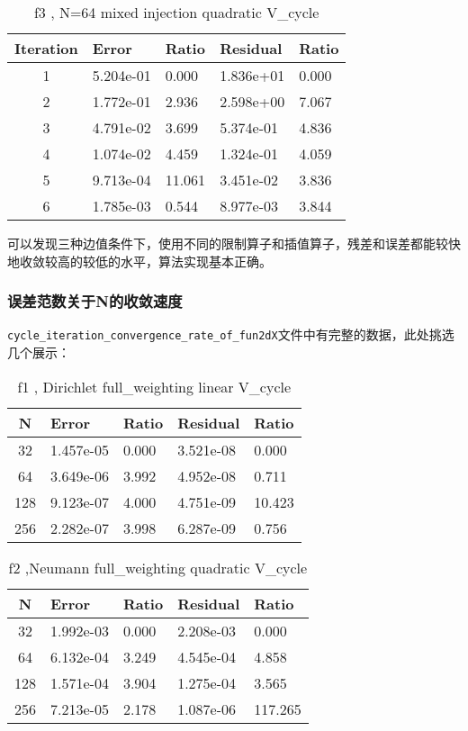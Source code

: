 \documentclass[12]{article}%
\begin{document}
\begin{table}[H]
    \centering
    \caption{f3 , N=64  mixed injection quadratic V\_cycle}
    \begin{tabular}{|c|l|l|l|l|}
    \hline
    Iteration & Error       & Ratio     & Residual    & Ratio     \\ \hline
 1 & 5.204e-01 & 0.000 & 1.836e+01 & 0.000\\ \hline 
 2 & 1.772e-01 & 2.936 & 2.598e+00 & 7.067\\ \hline 
 3 & 4.791e-02 & 3.699 & 5.374e-01 & 4.836\\ \hline 
 4 & 1.074e-02 & 4.459 & 1.324e-01 & 4.059\\ \hline 
 5 & 9.713e-04 & 11.061 & 3.451e-02 & 3.836\\ \hline 
 6 & 1.785e-03 & 0.544 & 8.977e-03 & 3.844\\ \hline    \end{tabular}
    \end{table}
    
可以发现三种边值条件下，使用不同的限制算子和插值算子，残差和误差都能较快地收敛较高的较低的水平，算法实现基本正确。

\subsubsection{{误差范数关于N的收敛速度}}

\verb|cycle_iteration_convergence_rate_of_fun2dX|文件中有完整的数据，此处挑选几个展示：

\begin{table}[H]
    \centering
    \caption{f1 , Dirichlet full\_weighting linear V\_cycle}
    \begin{tabular}{|c|l|l|l|l|}
    \hline
    N & Error       & Ratio     & Residual    & Ratio     \\ \hline
 32 & 1.457e-05 & 0.000 & 3.521e-08 & 0.000\\ \hline 
 64 & 3.649e-06 & 3.992 & 4.952e-08 & 0.711\\ \hline 
 128 & 9.123e-07 & 4.000 & 4.751e-09 & 10.423\\ \hline 
 256 & 2.282e-07 & 3.998 & 6.287e-09 & 0.756\\ \hline 
 \end{tabular}
    \end{table}
\begin{table}[H]
    \centering
    \caption{f2 ,Neumann full\_weighting quadratic V\_cycle}
    \begin{tabular}{|c|l|l|l|l|}
    \hline
    N & Error       & Ratio     & Residual    & Ratio     \\ \hline
    32 & 1.992e-03 & 0.000 & 2.208e-03 & 0.000\\ \hline 
    64 & 6.132e-04 & 3.249 & 4.545e-04 & 4.858\\ \hline 
    128 & 1.571e-04 & 3.904 & 1.275e-04 & 3.565\\ \hline 
    256 & 7.213e-05 & 2.178 & 1.087e-06 & 117.265\\ \hline 
 \end{tabular}
    \end{table}
\end{document}
